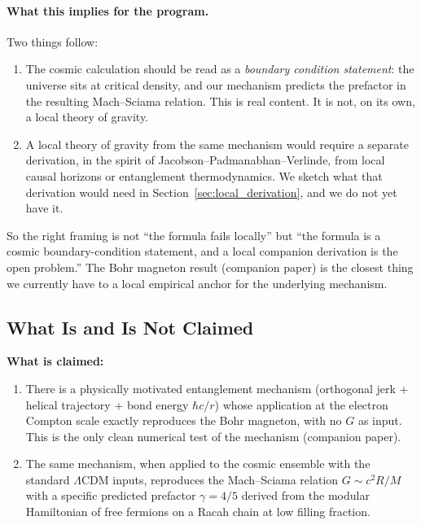 \documentclass[11pt,letterpaper]{article}
\begin{document}
\paragraph{What this implies for the program.}
Two things follow:
\begin{enumerate}
  \item The cosmic calculation should be read as a \emph{boundary
    condition statement}: the universe sits at critical density,
    and our mechanism predicts the prefactor in the resulting
    Mach--Sciama relation. This is real content. It is not, on its
    own, a local theory of gravity.
  \item A local theory of gravity from the same mechanism would
    require a separate derivation, in the spirit of
    Jacobson--Padmanabhan--Verlinde, from local causal horizons or
    entanglement thermodynamics. We sketch what that derivation
    would need in Section~\ref{sec:local_derivation}, and we do not
    yet have it.
\end{enumerate}

So the right framing is not ``the formula fails locally'' but ``the
formula is a cosmic boundary-condition statement, and a local
companion derivation is the open problem.'' The Bohr magneton
result (companion paper) is the closest thing we currently have to
a local empirical anchor for the underlying mechanism.

\subsection{What Is and Is Not Claimed}

\textbf{What is claimed:}
\begin{enumerate}
  \item There is a physically motivated entanglement mechanism
    (orthogonal jerk + helical trajectory + bond energy $\hbar c/r$)
    whose application at the electron Compton scale exactly
    reproduces the Bohr magneton, with no $G$ as input. This is the
    only clean numerical test of the mechanism (companion paper).
  \item The same mechanism, when applied to the cosmic ensemble with
    the standard $\Lambda$CDM inputs, reproduces the Mach--Sciama
    relation $G \sim c^2 R/M$ with a specific predicted prefactor
    $\gamma = 4/5$ derived from the modular Hamiltonian of free
    fermions on a Racah chain at low filling fraction.
\end{enumerate}
\end{document}
